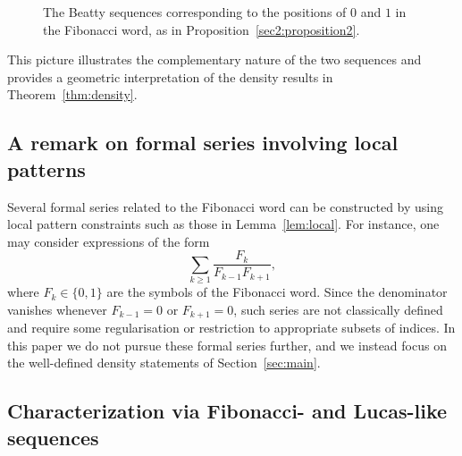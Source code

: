 \documentclass[12pt, a4paper]{article}
\begin{document}
\begin{figure}[H]
    \centering
    \caption{The Beatty sequences corresponding to the positions of $0$ and $1$ in the Fibonacci word, as in Proposition~\ref{sec2:proposition2}.}
    \label{fig002DuaaAvf}
\end{figure}

This picture illustrates the complementary nature of the two sequences and provides a geometric interpretation of the density results in Theorem~\ref{thm:density}.

\subsection{A remark on formal series involving local patterns}

Several formal series related to the Fibonacci word can be constructed by using local pattern constraints such as those in Lemma~\ref{lem:local}. For instance, one may consider expressions of the form
\[
\sum_{k \ge 1} \frac{F_k}{F_{k-1}F_{k+1}},
\]
where $F_k \in \{0,1\}$ are the symbols of the Fibonacci word. Since the denominator vanishes whenever $F_{k-1}=0$ or $F_{k+1}=0$, such series are not classically defined and require some regularisation or restriction to appropriate subsets of indices. In this paper we do not pursue these formal series further, and we instead focus on the well-defined density statements of Section~\ref{sec:main}.
\subsection{Characterization via Fibonacci- and Lucas-like sequences}
\end{document}
